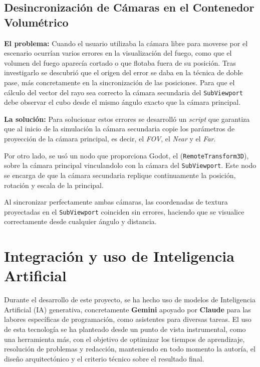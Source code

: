     \subsection[Desincronización de Cámaras]{Desincronización de Cámaras en el Contenedor Volumétrico}

    \textbf{El problema:} 
    Cuando el usuario utilizaba la cámara libre para moverse por el escenario ocurrían varios errores en la visualización del fuego, como que el volumen del fuego aparecía cortado o que flotaba fuera de su posición. Tras investigarlo se descubrió que el origen del error se daba en la técnica de doble pase, más concretamente en la sincronización de las posiciones. Para que el cálculo del vector del rayo sea correcto la cámara secundaria del \texttt{SubViewport} debe observar el cubo desde el mismo ángulo exacto que la cámara principal.

    \textbf{La solución:} 
    Para solucionar estos errores se desarrolló un \textit{script} que garantiza que al inicio de la simulación la cámara secundaria copie los parámetros de proyección de la cámara principal, es decir, el \textit{FOV}, el \textit{Near} y el \textit{Far}.
    
    Por otro lado, se usó un nodo que proporciona Godot, el  (\texttt{RemoteTransform3D}), sobre la cámara principal vinculandolo con la cámara del \texttt{SubViewport}. Este nodo se encarga de que la cámara secundaria replique continuamente la posición, rotación y escala de la principal.

    Al sincronizar perfectamente ambas cámaras, las coordenadas de textura proyectadas en el \texttt{SubViewport} coinciden sin errores, haciendo que se visualice correctamente desde cualquier ángulo y distancia.




\section{Integración y uso de Inteligencia Artificial}

    Durante el desarrollo de este proyecto, se ha hecho uso de modelos de Inteligencia Artificial (IA) generativa, concretamente \textbf{Gemini} apoyado por \textbf{Claude} para las labores específicas de programación, como asistentes para diversas tareas. El uso de esta tecnología se ha planteado desde un punto de vista instrumental, como una herramienta más, con el objetivo de optimizar los tiempos de aprendizaje, resolución de problemas y redacción, manteniendo en todo momento la autoría, el diseño arquitectónico y el criterio técnico sobre el resultado final.\\

